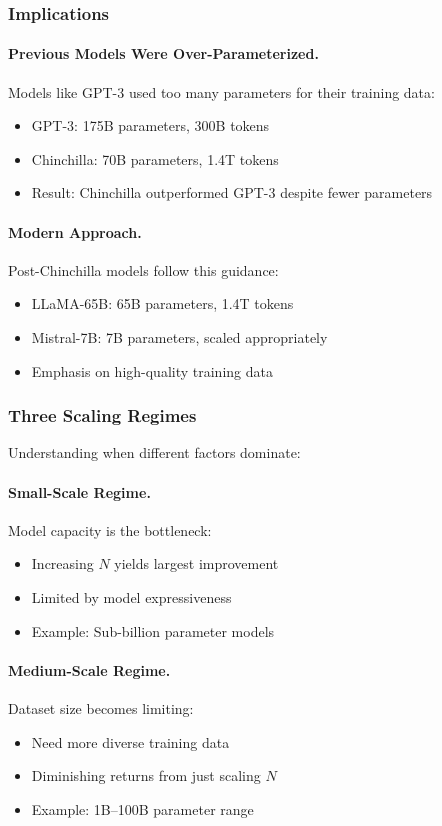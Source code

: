 \documentclass[class=article,crop=false]{standalone}
\begin{document}
\subsubsection{Implications}

\paragraph{Previous Models Were Over-Parameterized.} Models like GPT-3 used too many parameters for their training data:
\begin{itemize}
  \item GPT-3: 175B parameters, 300B tokens
  \item Chinchilla: 70B parameters, 1.4T tokens
  \item Result: Chinchilla outperformed GPT-3 despite fewer parameters
\end{itemize}

\paragraph{Modern Approach.} Post-Chinchilla models follow this guidance:
\begin{itemize}
  \item LLaMA-65B: 65B parameters, 1.4T tokens
  \item Mistral-7B: 7B parameters, scaled appropriately
  \item Emphasis on high-quality training data
\end{itemize}

\subsubsection{Three Scaling Regimes}

Understanding when different factors dominate:

\paragraph{Small-Scale Regime.} Model capacity is the bottleneck:
\begin{itemize}
  \item Increasing $N$ yields largest improvement
  \item Limited by model expressiveness
  \item Example: Sub-billion parameter models
\end{itemize}

\paragraph{Medium-Scale Regime.} Dataset size becomes limiting:
\begin{itemize}
  \item Need more diverse training data
  \item Diminishing returns from just scaling $N$
  \item Example: 1B--100B parameter range
\end{itemize}
\end{document}
